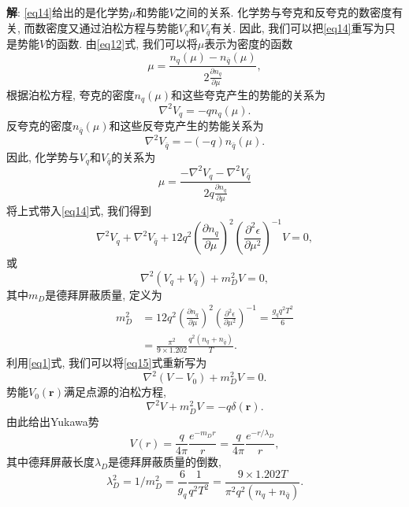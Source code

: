 \documentclass{ctexart}
\newenvironment{answer}{\textbf{解}:}{
\vspace{0.5cm}
}
\begin{document}
\begin{answer}
\eqref{eq14}给出的是化学势$\mu$和势能$V$之间的关系. 化学势与夸克和反夸克的数密度有关, 而数密度又通过泊松方程与势能$V_q$和$V_{\bar{q}}$有关. 因此, 我们可以把\eqref{eq14}重写为只是势能$V$的函数. 由\eqref{eq12}式, 我们可以将$\mu$表示为密度的函数
\begin{equation}
  \mu = \frac{n_q(\mu) - n_{\bar{q}}(\mu)}{2 \frac{\partial n_q}{\partial \mu}},
\end{equation}
根据泊松方程, 夸克的密度$n_q(\mu)$和这些夸克产生的势能的关系为
\begin{equation}
  \nabla^2 V_q = -q n_q (\mu).
\end{equation}
反夸克的密度$n_{\bar{q}}(\mu)$和这些反夸克产生的势能关系为
\begin{equation}
  \nabla^2 V_{\bar{q}} = -(-q)n_{\bar{q}} (\mu).
\end{equation}
因此, 化学势与$V_q$和$V_{\bar{q}}$的关系为
\begin{equation}
  \mu = \frac{-\nabla^2 V_q - \nabla^2 V_{\bar{q}}}{2q \frac{\partial n_q}{\partial \mu}}
\end{equation}
将上式带入\eqref{eq14}式, 我们得到
\begin{equation}
  \nabla^2 V_q + \nabla^2 V_{\bar{q}} + 12 q^2 \left( \frac{\partial n_q}{\partial \mu} \right)^2 \left( \frac{\partial^2\epsilon}{\partial \mu^2} \right)^{-1} V = 0,
\end{equation}
或
\begin{equation}\label{eq15}
  \nabla^2 (V_q + V_{\bar{q}}) + m_D^2 V = 0,
\end{equation}
其中$m_D$是德拜屏蔽质量, 定义为
\begin{equation}
  \begin{split}
    m_D^2 &= 12 q^2 \left( \frac{\partial n_q}{\partial \mu} \right)^2 \left( \frac{\partial^2 \epsilon}{\partial \mu^2} \right)^{-1} = \frac{g_q q^2 T^2}{6} \\
    &= \frac{\pi^2}{9\times 1.202} \frac{q^2 (n_q + n_{\bar{q}})}{T}.
  \end{split}
\end{equation}
利用\eqref{eq1}式, 我们可以将\eqref{eq15}式重新写为
\begin{equation}
  \nabla^2(V - V_0) + m_D^2 V = 0.
\end{equation}
势能$V_0(\bm{r})$满足点源的泊松方程,
\begin{equation}
  \nabla^2 V + m_D^2 V = -q \delta(\bm{r}).
\end{equation}
由此给出Yukawa势
\begin{equation}
  V(r) = \frac{q}{4\pi} \frac{e^{-m_Dr}}{r} = \frac{q}{4\pi} \frac{e^{-r/\lambda_D}}{r},
\end{equation}
其中德拜屏蔽长度$\lambda_D$是德拜屏蔽质量的倒数,
\begin{equation}
  \lambda_D^2 = 1 / m_D^2 = \frac{6}{g_q} \frac{1}{q^2T^2} = \frac{9 \times 1.202 T}{\pi^2 q^2 (n_q + n_{\bar{q}})}.
\end{equation}


\end{answer}
\end{document}
